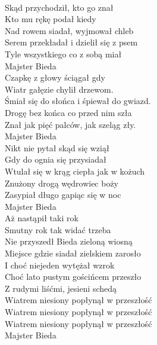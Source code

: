 
\tab{}\tab{} \\
Skąd przychodził, kto go znał  \tab{}\tab{}  \\
Kto mu rękę podał kiedy \tab{}\tab{} \\
Nad rowem siadał, wyjmował chleb \tab{} \\
Serem przekładał i dzielił się z psem \tab{} \\
Tyle wszystkiego co z sobą miał  \tab{} \\
Majster Bieda \\
\hops
Czapkę z głowy ściągał gdy \\
Wiatr gałęzie chylił drzewom. \\
Śmiał się do słońca i śpiewał do gwiazd. \\
Drogę bez końca co przed nim szła \\
Znał jak pięć palców, jak szeląg zły. \\
Majster Bieda \\
\hops
Nikt nie pytał skąd się wziął \\
Gdy do ognia się przysiadał \\
Wtulał się w krąg ciepła jak w kożuch \\
Znużony drogą wędrowiec boży \\
Zasypiał długo gapiąc się w noc \\
Majster Bieda \\
\hops
Aż nastąpił taki rok \\
Smutny rok tak widać trzeba \\
Nie przyszedł Bieda zieloną wiosną \\
Miejsce gdzie siadał zielskiem zarosło \\
I choć niejeden wytężał wzrok \\
Choć lato pustym gościńcem przeszło \\
Z rudymi liśćmi, jesieni schedą \\
Wiatrem niesiony popłynął w przeszłość \\
Wiatrem niesiony popłynął w przeszłość \\
Wiatrem niesiony popłynął w przeszłość \\
Majster Bieda
